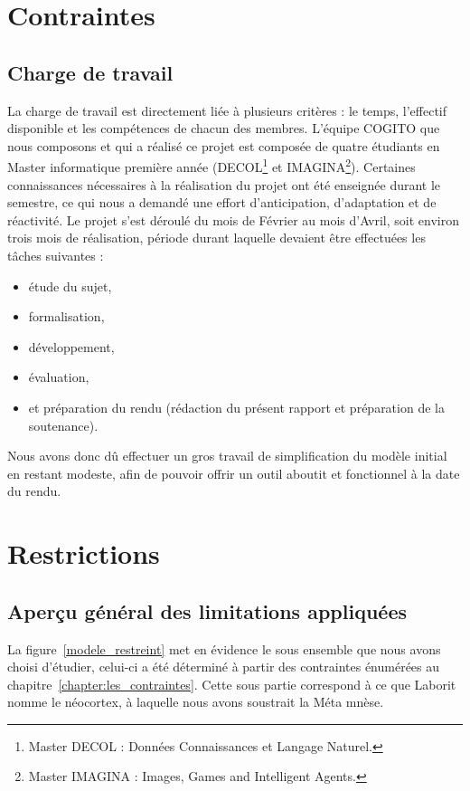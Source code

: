 \section{Contraintes}

\subsection{Charge de travail}
La charge de travail est directement liée à plusieurs critères : le temps,
l'effectif disponible et les compétences de chacun des membres. L'équipe COGITO que nous 
composons et qui a réalisé ce projet est composée de
quatre étudiants en Master informatique première année (DECOL\footnote{Master
DECOL : Données Connaissances et Langage Naturel.} et IMAGINA\footnote{Master
IMAGINA : Images, Games and Intelligent Agents.}). Certaines connaissances 
nécessaires à la réalisation du projet ont été enseignée durant le semestre, ce qui nous a demandé une effort d'anticipation, d'adaptation et de réactivité. Le projet s'est déroulé du mois de Février au mois d'Avril, soit environ trois mois de réalisation, période durant laquelle devaient être effectuées les tâches
suivantes :

\begin{itemize}
\item étude du sujet, 
\item formalisation, 
\item développement, 
\item évaluation,
\item et préparation du rendu (rédaction du présent rapport et préparation de la soutenance).
\end{itemize}

Nous avons donc dû effectuer un gros travail de simplification du modèle initial en restant modeste, afin de pouvoir offrir un outil aboutit et fonctionnel à la date du rendu.

\section{Restrictions}

\subsection{Aperçu général des limitations appliquées}

La figure~\ref{modele_restreint} met en évidence le sous ensemble que nous avons choisi d'étudier, celui-ci a été déterminé à partir des contraintes énumérées au chapitre~\ref{chapter:les_contraintes}. Cette sous partie correspond à ce que Laborit nomme le néocortex, à laquelle nous avons soustrait la Méta mnèse.

